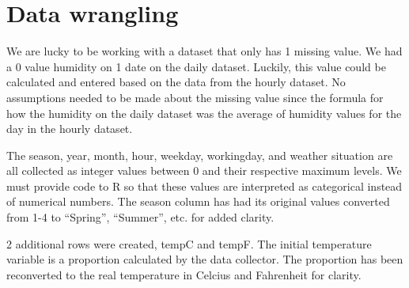 \documentclass[]{article}
\newenvironment{Shaded}{\begin{snugshade}}{\end{snugshade}}
\newcommand{\KeywordTok}[1]{\textcolor[rgb]{0.13,0.29,0.53}{\textbf{#1}}}
\newcommand{\DataTypeTok}[1]{\textcolor[rgb]{0.13,0.29,0.53}{#1}}
\newcommand{\CommentTok}[1]{\textcolor[rgb]{0.56,0.35,0.01}{\textit{#1}}}
\newcommand{\OtherTok}[1]{\textcolor[rgb]{0.56,0.35,0.01}{#1}}
\newcommand{\OperatorTok}[1]{\textcolor[rgb]{0.81,0.36,0.00}{\textbf{#1}}}
\newcommand{\NormalTok}[1]{#1}
\begin{document}
\section{Data wrangling}\label{data-wrangling}

We are lucky to be working with a dataset that only has 1 missing value.
We had a 0 value humidity on 1 date on the daily dataset. Luckily, this
value could be calculated and entered based on the data from the hourly
dataset. No assumptions needed to be made about the missing value since
the formula for how the humidity on the daily dataset was the average of
humidity values for the day in the hourly dataset.

The season, year, month, hour, weekday, workingday, and weather
situation are all collected as integer values between 0 and their
respective maximum levels. We must provide code to R so that these
values are interpreted as categorical instead of numerical numbers. The
season column has had its original values converted from 1-4 to
``Spring'', ``Summer'', etc. for added clarity.

2 additional rows were created, tempC and tempF. The initial temperature
variable is a proportion calculated by the data collector. The
proportion has been reconverted to the real temperature in Celcius and
Fahrenheit for clarity.

\begin{Shaded}
\end{Shaded}
\end{document}
